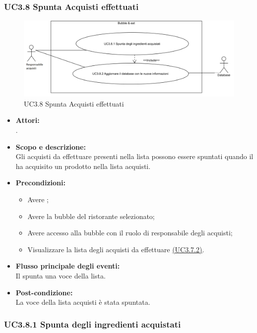 \subsubsection{UC3.8 Spunta Acquisti effettuati} \label{UC3.8}

\begin{figure}[H]
	\centering
	\includegraphics[width=15cm]{../../documenti/AnalisiDeiRequisiti/Diagrammi_img/uc3_8.png}
	\caption{UC3.8 Spunta Acquisti effettuati}
\end{figure}

\begin{itemize}
	\item \textbf{Attori:}
	\\.
	\item \textbf{Scopo e descrizione:} 
	\\Gli acquisti da effettuare presenti nella lista possono essere spuntati quando il  ha acquisito un prodotto nella lista acquisti.
	\item \textbf{Precondizioni:}
	\begin{itemize}
		\item Avere ;
		\item Avere la bubble del ristorante selezionato;
		\item Avere accesso alla bubble con il ruolo di responsabile degli acquisti;
		\item Visualizzare la lista degli acquisti da effettuare \hyperref[UC3.7.2]{(UC3.7.2)}.
	\end{itemize}
	\item \textbf{Flusso principale degli eventi:}
	\\Il {} spunta una voce della lista.
	\item \textbf{Post-condizione:}
	\\La voce della lista acquisti è stata spuntata.
\end{itemize}

\subsubsection{UC3.8.1 Spunta degli ingredienti acquistati} \label{UC3.8.1}

